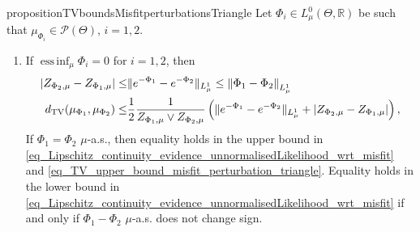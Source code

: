 \documentclass[a4paper]{scrartcl}
\theoremstyle{definition}
\numberwithin{equation}{section}
\newcommand{\R}{\mathbb{R}}
\DeclareMathOperator*{\essinf}{ess\,inf}
\newcommand{\abs}[1]{\vert #1\vert}
\newcommand{\norm}[1]{\Vert #1 \Vert}
\newcommand{\Norm}[1]{\left\Vert #1 \right\Vert}
\newcommand{\TV}[0]{\textup{TV}}
\begin{document}
\begin{restatable}{proposition}{TVboundsMisfitperturbationsTriangle}
\label{proposition_TV_bounds_misfit_perturbations_via_triangle_inequality}
 Let $\Phi_i\in L^0_\mu(\Theta,\R)$ be such that $\mu_{\Phi_i}\in\mathcal{P}(\Theta)$, $i=1,2$.
 \begin{enumerate}
 \item \label{item_proposition_TV_bounds_misfit_perturbations_via_triangle_inequality_upper_bound}
If $\essinf_\mu\Phi_i= 0$ for $i=1,2$, then
\begin{align}
\abs{Z_{\Phi_2,\mu}-Z_{\Phi_1,\mu}}\leq &\norm{ e^{-\Phi_1}-e^{-\Phi_2}}_{L^1_\mu}\leq\Norm{\Phi_1-\Phi_2}_{L^1_\mu}
\label{eq_Lipschitz_continuity_evidence_unnormalisedLikelihood_wrt_misfit}
\\
  d_{\TV}(\mu_{\Phi_1},\mu_{\Phi_2})\leq& \frac{1}{2}\frac{1}{Z_{\Phi_1,\mu}\vee Z_{\Phi_2,\mu}}\left(\norm{ e^{-\Phi_1}-e^{-\Phi_2}}_{L^1_\mu}+ \abs{Z_{\Phi_2,\mu}-Z_{\Phi_1,\mu}}\right),
  \label{eq_TV_upper_bound_misfit_perturbation_triangle}
 \end{align}
 If $\Phi_1=\Phi_2$ $\mu$-a.s., then equality holds in the upper bound in \eqref{eq_Lipschitz_continuity_evidence_unnormalisedLikelihood_wrt_misfit} and  \eqref{eq_TV_upper_bound_misfit_perturbation_triangle}.
 Equality holds in the lower bound in \eqref{eq_Lipschitz_continuity_evidence_unnormalisedLikelihood_wrt_misfit} if and only if $\Phi_1-\Phi_2$ $\mu$-a.s. does not change sign.


\end{enumerate}
\end{restatable}
\end{document}
